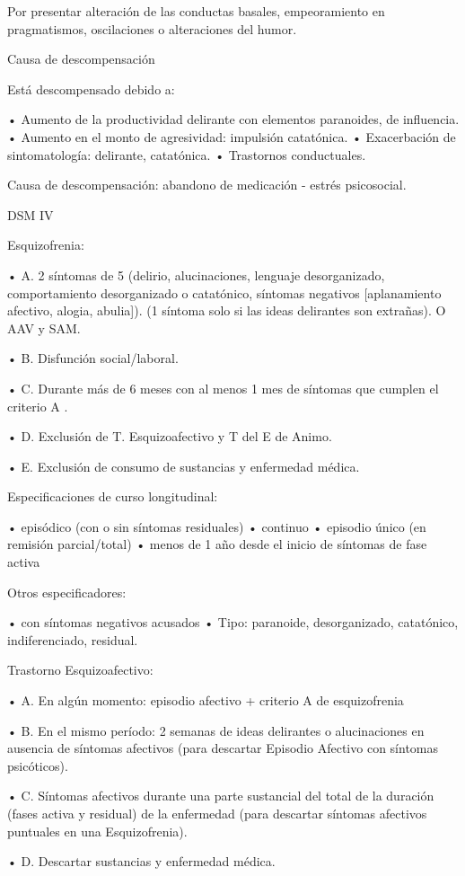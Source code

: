 Por presentar alteración de las conductas basales, empeoramiento en pragmatismos, oscilaciones o alteraciones del humor.

Causa de descompensación

Está descompensado debido a:

• Aumento de la productividad delirante con elementos paranoides, de influencia.
• Aumento en el monto de agresividad: impulsión catatónica.
• Exacerbación de sintomatología: delirante, catatónica.
• Trastornos conductuales.

Causa de descompensación: abandono de medicación - estrés psicosocial.

DSM IV

Esquizofrenia:

• A. 2 síntomas de 5 (delirio, alucinaciones, lenguaje desorganizado, comportamiento desorganizado o catatónico, síntomas negativos [aplanamiento afectivo, alogia, abulia]). (1 síntoma solo si las ideas delirantes son extrañas). O AAV y SAM.

• B. Disfunción social/laboral.

• C. Durante más de 6 meses con al menos 1 mes de síntomas que cumplen el criterio A .

• D. Exclusión de T. Esquizoafectivo y T del E de Animo.

• E. Exclusión de consumo de sustancias y enfermedad médica.

Especificaciones de curso longitudinal:

• episódico (con o sin síntomas residuales)
• continuo
• episodio único (en remisión parcial/total)
• menos de 1 año desde el inicio de síntomas de fase activa

Otros especificadores:

• con síntomas negativos acusados
• Tipo: paranoide, desorganizado, catatónico, indiferenciado, residual.

Trastorno Esquizoafectivo:

• A. En algún momento: episodio afectivo + criterio A de esquizofrenia

• B. En el mismo período: 2 semanas de ideas delirantes o alucinaciones en ausencia de síntomas afectivos (para descartar Episodio Afectivo con síntomas psicóticos).

• C. Síntomas afectivos durante una parte sustancial del total de la duración (fases activa y residual) de la enfermedad (para descartar síntomas afectivos puntuales en una Esquizofrenia).

• D. Descartar sustancias y enfermedad médica.

